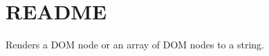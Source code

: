 \chapter{README}
\hypertarget{md_node__modules_2svgo_2node__modules_2dom-serializer_2README}{}\label{md_node__modules_2svgo_2node__modules_2dom-serializer_2README}
Renders a DOM node or an array of DOM nodes to a string. 